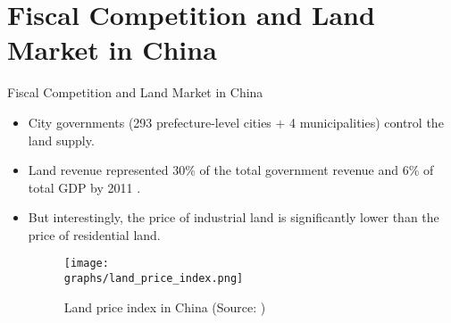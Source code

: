 \documentclass[xcolor={dvipsnames}]{beamer}
\theoremstyle{plain}
\newcommand{\graphs}{../../Graphs}
\begin{document}
\section{Fiscal Competition and Land Market in China}
\begin{frame}{Fiscal Competition and Land Market in China}
    \begin{itemize}
        \item City governments (293 prefecture-level cities + 4 municipalities) control the land supply.
        \item Land revenue represented 30\% of the total government revenue and 6\% of total GDP by 2011
              \cite{chen2019busting}.
        \item But interestingly, the price of industrial land is significantly
              lower than the price of residential land.
              \begin{figure}
                  \centering
                  \texttt{[image: \\graphs/land\_price\_index.png]}
                  \caption*{\footnotesize
                      {Land price index in China
                          (Source: )}}
                  \label{land price}
              \end{figure}
    \end{itemize}
\end{frame}
\end{document}
